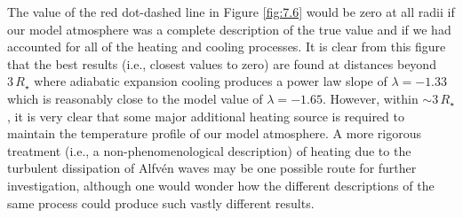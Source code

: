 The value of the red dot-dashed line in Figure \ref{fig:7.6} would be zero at all radii if our model atmosphere was a complete description of the true value and if we had accounted for all of the heating and cooling processes. It is clear from this figure that the best results (i.e., closest values to zero) are found at distances beyond  $3\,R_{\star}$ where adiabatic expansion cooling produces a power law slope of $\lambda =-1.33$ which is reasonably close to the model value of $\lambda =-1.65$. However, within $\sim 3\,R_{\star}$, it is very clear that some major additional heating source is required to maintain the temperature profile of our model atmosphere. A more rigorous treatment (i.e., a non-phenomenological description) of heating due to the turbulent dissipation of Alfv\'en waves may be one possible route for further investigation, although one would wonder how the different descriptions of the same process could produce such vastly different results. 